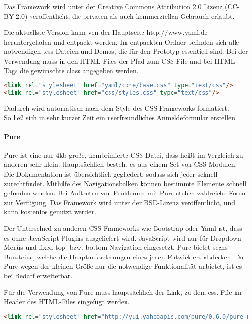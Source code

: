 Das Framework wird unter der Creative Commons Attribution 2.0 Lizenz (CC-BY 2.0) veröffentlicht, die privaten als auch kommerziellen Gebrauch erlaubt.

Die aktuellste Version kann von der Hauptseite http://www.yaml.de heruntergeladen und entpackt werden. Im entpackten Ordner befinden sich alle notwendigen .css Dateien und Demos, die für den Prototyp essentiell sind. Bei der Verwendung muss in den HTML Files der Pfad zum CSS File und bei HTML Tags die gewünschte class angegeben werden. 
\begin{lstlisting}[caption={YAML einbinden \cite{YAMLPROTO}}, language=HTML]
<link rel="stylesheet" href="yaml/core/base.css" type="text/css"/>
<link rel="stylesheet" href="css/styles.css" type="text/css"/>
\end{lstlisting}

Dadurch wird automatisch nach dem Style des CSS-Frameworks formatiert.\\
So ließ sich in sehr kurzer Zeit ein userfreundliches Anmeldeformular erstellen.

\paragraph{Pure}
Pure ist eine nur 4kb große, kombrimierte CSS-Datei, dass heißt im Vergleich zu anderen sehr klein. Hauptsächlich besteht es aus einem Set von CSS Modulen. Die Dokumentation ist übersichtlich gegliedert, sodass sich jeder schnell zurechtfindet. Mithilfe des Navigationsbalken können bestimmte Elemente schnell gefunden werden. Bei Auftreten von Problemen mit Pure stehen zahlreiche Foren zur Verfügung. Das Framework wird unter der BSD-Lizenz veröffentlicht, und kann kostenlos genutzt werden.

Der Unterschied zu anderen CSS-Frameworks wie Bootstrap oder Yaml ist, dass es ohne JavaScript Plugins ausgeliefert wird. JavaScript wird nur für Dropdown-Menüs und fixed top- bzw. bottom-Navigation eingesetzt. Pure bietet sechs Bausteine, welche die Hauptanforderungen eines jeden Entwicklers abdecken. Da Pure wegen der kleinen Größe nur die notwendige Funktionalität anbietet, ist es bei Bedarf erweiterbar.

Für die Verwendung von Pure muss hauptsächlich der Link, zu dem css. File im Header des HTML-Files eingefügt werden. \cite{PURE}
\begin{lstlisting}[caption={Pure einbinden \cite{PURE}}, language=HTML]
<link rel="stylesheet" href="http://yui.yahooapis.com/pure/0.6.0/pure-min.css">
\end{lstlisting}

